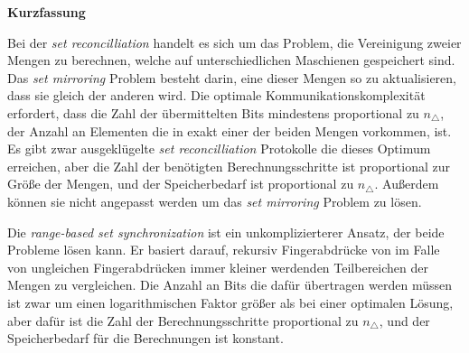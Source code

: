 
\thispagestyle{plain}
\begin{center}
    \Large
    \vspace{0.9cm}
    \textbf{Kurzfassung}
\end{center}

Bei der \textit{set reconcilliation} handelt es sich um das Problem, die Vereinigung zweier Mengen zu berechnen, welche auf unterschiedlichen Maschienen gespeichert sind. Das \textit{set mirroring} Problem besteht darin, eine dieser Mengen so zu aktualisieren, dass sie gleich der anderen wird. Die optimale Kommunikationskomplexität erfordert, dass die Zahl der übermittelten Bits mindestens proportional zu $n_{\triangle}$, der Anzahl an Elementen die in exakt einer der beiden Mengen vorkommen, ist. Es gibt zwar ausgeklügelte \textit{set reconcilliation} Protokolle die dieses Optimum erreichen, aber die Zahl der benötigten Berechnungsschritte ist proportional zur Größe der Mengen, und der Speicherbedarf ist proportional zu $n_{\triangle}$. Außerdem können sie nicht angepasst werden um das \textit{set mirroring} Problem zu lösen.

Die \textit{range-based set synchronization} ist ein unkomplizierterer Ansatz, der beide Probleme lösen kann. Er basiert darauf, rekursiv Fingerabdrücke von im Falle von ungleichen Fingerabdrücken immer kleiner werdenden Teilbereichen der Mengen zu vergleichen. Die Anzahl an Bits die dafür übertragen werden müssen ist zwar um einen logarithmischen Faktor größer als bei einer optimalen Lösung, aber dafür ist die Zahl der Berechnungsschritte proportional zu $n_{\triangle}$, und der Speicherbedarf für die Berechnungen ist konstant.